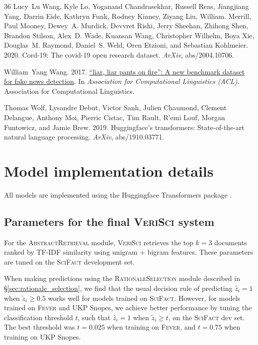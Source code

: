 \documentclass[11pt,a4paper]{article}
\newcommand{\ours}{\textsc{SciFact}\xspace}
\newcommand{\sysname}{\textsc{VeriSci}\xspace}
\newcommand{\fever}{\textsc{Fever}\xspace}
\newcommand{\snopes}{UKP Snopes\xspace}
\newcommand{\componentone}{\textsc{AbstractRetrieval}\xspace}
\newcommand{\componenttwo}{\textsc{RationaleSelection}\xspace}
\begin{document}
\begin{thebibliography}{36}
Lucy~Lu Wang, Kyle Lo, Yoganand Chandrasekhar, Russell Reas, Jiangjiang Yang,
  Darrin Eide, Kathryn Funk, Rodney Kinney, Ziyang Liu, William. Merrill, Paul
  Mooney, Dewey~A. Murdick, Devvret Rishi, Jerry Sheehan, Zhihong Shen, Brandon
  Stilson, Alex~D. Wade, Kuansan Wang, Christopher Wilhelm, Boya Xie,
  Douglas~M. Raymond, Daniel~S. Weld, Oren Etzioni, and Sebastian Kohlmeier.
  2020.
\newblock Cord-19: The covid-19 open research dataset.
\newblock \emph{ArXiv}, abs/2004.10706.

William~Yang Wang. 2017.
\newblock \href {https://doi.org/10.18653/v1/P17-2067} {{``}liar, liar pants on
  fire{''}: A new benchmark dataset for fake news detection}.
\newblock In \emph{Association for Computational Linguistics (ACL)}.
  Association for Computational Linguistics.

Thomas Wolf, Lysandre Debut, Victor Sanh, Julien Chaumond, Clement Delangue,
  Anthony Moi, Pierric Cistac, Tim Rault, R'emi Louf, Morgan Funtowicz, and
  Jamie Brew. 2019.
\newblock Huggingface's transformers: State-of-the-art natural language
  processing.
\newblock \emph{ArXiv}, abs/1910.03771.

\end{thebibliography}
 


\clearpage

\appendix

\section{Model implementation details} \label{sec:model_details}

All models are implemented using the Huggingface Transformers package \cite{Wolf2019HuggingFacesTS}.



\subsection{Parameters for the final \sysname system} \label{sec:parameters}

For the \componentone module, \sysname retrieves the top $k=3$ documents ranked by TF-IDF similarity using unigram + bigram features. These parameters are tuned on the \ours development set.

When making predictions using the \componenttwo module described in \S\ref{sec:rationale_selection}, we find that the usual decision rule of predicting $\hat{z}_i = 1$ when $\tilde{z}_i \geq 0.5$ works well for models trained on \ours. However, for models trained on \fever and \snopes, we achieve better performance by tuning the classification threshold $t$, such that $\hat{z}_i = 1$  when $\tilde{z}_i \geq t$, on the \ours dev set. The best threshold was $t=0.025$ when training on \fever, and $t=0.75$ when training on \snopes.
\end{document}
